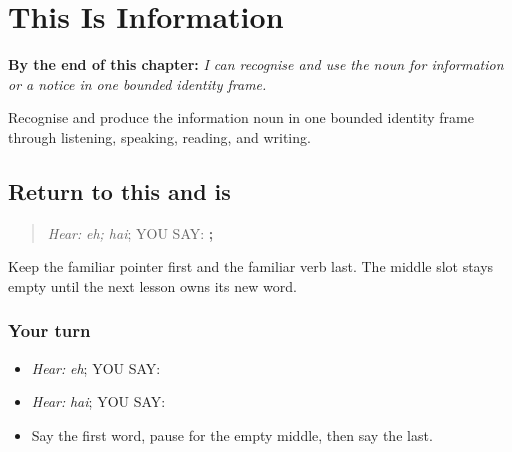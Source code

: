 
\chapter{This Is Information}
\label{ch:pa-a2-suchna}

\begin{chapteropening}
\textbf{By the end of this chapter:} \emph{I can recognise and use the noun for information or a notice in one bounded identity frame.}

Recognise and produce the information noun in one bounded identity frame through listening, speaking, reading, and writing.
\end{chapteropening}

\section[\texorpdfstring{\pa{ਇਹ} · \pa{ਹੈ} (eh; hai)}{ਇਹ · ਹੈ (eh; hai)}]{Return to this and is}

\label{lesson:PA-C199-information-return}



\begin{quote}
\emph{Hear:} \emph{eh; hai}; YOU SAY: \textbf{; }
\end{quote}

\begin{grammarlens}[title={Grammar Lens}]
Keep the familiar pointer first and the familiar verb last. The middle slot stays empty until the next lesson owns its new word.
\end{grammarlens}

\subsection*{Your turn}
\begin{itemize}
\raggedright
  \item \emph{Hear:} \emph{eh}; YOU SAY: \textbf{}
  \item \emph{Hear:} \emph{hai}; YOU SAY: \textbf{}
  \item Say the first word, pause for the empty middle, then say the last.
\end{itemize}

